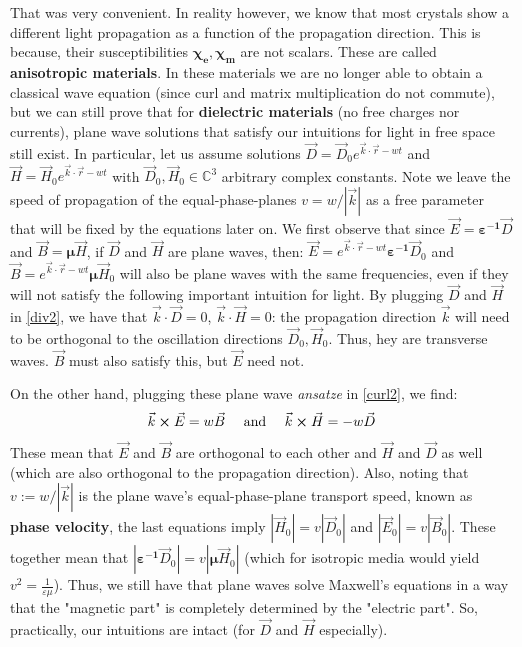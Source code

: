 \documentclass[11pt, a4paper, twoside]{article} %
\newcommand{\C}{\mathbb{C}}
\begin{document}
That was very convenient. In reality however, we know that most crystals show a different light propagation as a function of the propagation direction. This is because, their susceptibilities $\pmb{\chi_e},\pmb{\chi_m}$ are not scalars. These are called {\bf anisotropic materials}. In these materials we are no longer able to obtain a classical wave equation (since curl and matrix multiplication do not commute), but we can still prove that for {\bf dielectric materials} (no free charges nor currents), plane wave solutions that satisfy our intuitions for light in free space still exist. In particular, let us assume solutions $\vec{D}=\vec{D}_0e^{\vec{k}\cdot\vec{r}-wt}$ and $\vec{H}=\vec{H}_0e^{\vec{k}\cdot\vec{r}-wt}$ with $\vec{D}_0,\vec{H}_0\in\C^3$ arbitrary complex constants. Note we leave the speed of propagation of the equal-phase-planes $v=w/|\vec{k}|$ as a free parameter that will be fixed by the equations later on. We first observe that since $\vec{E}=\pmb{\varepsilon^{-1}}\vec{D}$ and $\vec{B}=\pmb{\mu}\vec{H}$, if $\vec{D}$ and $\vec{H}$ are plane waves, then: $\vec{E}=e^{\vec{k}\cdot\vec{r}-wt}\pmb{\varepsilon^{-1}}\vec{D}_0$ and $\vec{B}=e^{\vec{k}\cdot\vec{r}-wt}\pmb{\mu}\vec{H}_0$ will also be plane waves with the same frequencies, even if they will not satisfy the following important intuition for light. By plugging $\vec{D}$ and $\vec{H}$ in \eqref{div2}, we have that $\vec{k}\cdot\vec{D}=0$,  $\vec{k}\cdot\vec{H}=0$: the propagation direction $\vec{k}$ will need to be orthogonal to the oscillation directions $\vec{D}_0,\vec{H}_0$. Thus, hey are transverse waves. $\vec{B}$ must also satisfy this, but $\vec{E}$ need not.

 On the other hand, plugging these plane wave {\em ansatze} in \eqref{curl2}, we find:\vspace{-0.1cm}
\begin{equation}\label{Fcurl}
\vec{k}\cross\vec{E}=w\vec{B} \quad \text{           and           }\quad  \vec{k}\cross\vec{H}=-w\vec{D}\vspace{-0.1cm}
\end{equation}  
These mean that $\vec{E}$ and $\vec{B}$ are orthogonal to each other and $\vec{H}$ and $\vec{D}$ as well (which are also orthogonal to the propagation direction). Also, noting that $v:=w/|\vec{k}|$ is the plane wave's equal-phase-plane transport speed, known as {\bf phase velocity}, the last equations imply $|\vec{H}_0|=v|\vec{D}_0|$ and $|\vec{E}_0|=v|\vec{B}_0|$. These together mean that $|\pmb{\varepsilon^{-1}}\vec{D}_0|=v|\pmb{\mu}\vec{H}_0|$ (which for isotropic media would yield $v^2=\frac{1}{\varepsilon\mu}$). Thus, we still have that plane waves solve Maxwell's equations in a way that the "magnetic part" is completely determined by the "electric part". So, practically, our intuitions are intact (for $\vec{D}$ and $\vec{H}$ especially). \vspace{-0.2cm}
\end{document}
